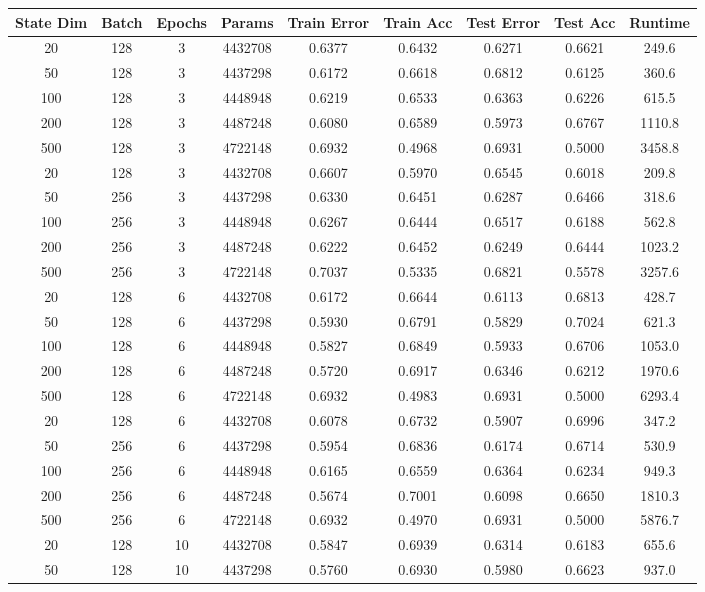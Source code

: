 \documentclass[letterpaper, 10pt]{article}
\begin{document}
\begin{longtable}{c | c | c | c | c | c | c | c | c}
State Dim & Batch & Epochs & Params & Train Error & Train Acc & Test Error & Test Acc & Runtime\\
\hline
\endhead
20 & 128 & 3 & 4432708 & 0.6377 & 0.6432 & 0.6271 & 0.6621 & 249.6 \\
50 & 128 & 3 & 4437298 & 0.6172 & 0.6618 & 0.6812 & 0.6125 & 360.6 \\
100 & 128 & 3 & 4448948 & 0.6219 & 0.6533 & 0.6363 & 0.6226 & 615.5 \\
200 & 128 & 3 & 4487248 & 0.6080 & 0.6589 & 0.5973 & 0.6767 & 1110.8 \\
500 & 128 & 3 & 4722148 & 0.6932 & 0.4968 & 0.6931 & 0.5000 & 3458.8 \\
20 & 128 & 3 & 4432708 & 0.6607 & 0.5970 & 0.6545 & 0.6018 & 209.8 \\
50 & 256 & 3 & 4437298 & 0.6330 & 0.6451 & 0.6287 & 0.6466 & 318.6 \\
100 & 256 & 3 & 4448948 & 0.6267 & 0.6444 & 0.6517 & 0.6188 & 562.8 \\
200 & 256 & 3 & 4487248 & 0.6222 & 0.6452 & 0.6249 & 0.6444 & 1023.2 \\
500 & 256 & 3 & 4722148 & 0.7037 & 0.5335 & 0.6821 & 0.5578 & 3257.6 \\
\hline
20 & 128 & 6 & 4432708 & 0.6172 & 0.6644 & 0.6113 & 0.6813 & 428.7 \\
50 & 128 & 6 & 4437298 & 0.5930 & 0.6791 & 0.5829 & 0.7024 & 621.3 \\
100 & 128 & 6 & 4448948 & 0.5827 & 0.6849 & 0.5933 & 0.6706 & 1053.0 \\
200 & 128 & 6 & 4487248 & 0.5720 & 0.6917 & 0.6346 & 0.6212 & 1970.6 \\
500 & 128 & 6 & 4722148 & 0.6932 & 0.4983 & 0.6931 & 0.5000 & 6293.4 \\
20 & 128 & 6 & 4432708 & 0.6078 & 0.6732 & 0.5907 & 0.6996 & 347.2 \\
50 & 256 & 6 & 4437298 & 0.5954 & 0.6836 & 0.6174 & 0.6714 & 530.9 \\
100 & 256 & 6 & 4448948 & 0.6165 & 0.6559 & 0.6364 & 0.6234 & 949.3 \\
200 & 256 & 6 & 4487248 & 0.5674 & 0.7001 & 0.6098 & 0.6650 & 1810.3 \\
500 & 256 & 6 & 4722148 & 0.6932 & 0.4970 & 0.6931 & 0.5000 & 5876.7 \\
\hline
20 & 128 & 10 & 4432708 & 0.5847 & 0.6939 & 0.6314 & 0.6183 & 655.6 \\
50 & 128 & 10 & 4437298 & 0.5760 & 0.6930 & 0.5980 & 0.6623 & 937.0 \\

\end{longtable}
\end{document}
